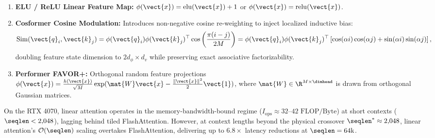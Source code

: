 \begin{enumerate}
\item \textbf{ELU / ReLU Linear Feature Map:} $\phi(\vect{x}) = \operatorname{elu}(\vect{x}) + 1$ or $\phi(\vect{x}) = \operatorname{relu}(\vect{x})$.
\item \textbf{Cosformer Cosine Modulation:} Introduces non-negative cosine re-weighting to inject localized inductive bias:
\begin{equation}
\operatorname{Sim}(\vect{q}_i, \vect{k}_j) = \phi(\vect{q}_i)\phi(\vect{k}_j)^\top \cos\left(\frac{\pi(i - j)}{2M}\right) = \phi(\vect{q}_i)\phi(\vect{k}_j)^\top \left[\cos(\alpha i)\cos(\alpha j) + \sin(\alpha i)\sin(\alpha j)\right],
\end{equation}
doubling feature state dimension to $2d_\phi \times d_v$ while preserving exact associative factorizability.
\item \textbf{Performer FAVOR+:} Orthogonal random feature projections $\phi(\vect{x}) = \frac{h(\vect{x})}{\sqrt{M}} \exp(\mat{W}\vect{x} - \frac{\|\vect{x}\|^2}{2}\vect{1})$, where $\mat{W} \in \R^{M \times \dimhead}$ is drawn from orthogonal Gaussian matrices.
\end{enumerate}
On the RTX 4070, linear attention operates in the memory-bandwidth-bound regime ($I_{\text{ops}} \approx 32\text{--}42\text{ FLOP/Byte}$) at short contexts ($\seqlen < 2{,}048$), lagging behind tiled FlashAttention. However, at context lengths beyond the physical crossover $\seqlen^* \approx 2{,}048$, linear attention's $\mathcal{O}(\seqlen)$ scaling overtakes FlashAttention, delivering up to $6.8\times$ latency reductions at $\seqlen = 64\text{k}$.

